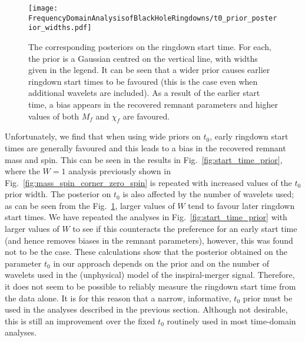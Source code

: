 \begin{figure}[t!]
    \centering
    \texttt{[image: FrequencyDomainAnalysisofBlackHoleRingdowns/t0\_prior\_posterior\_widths.pdf]}
    \caption[SHORT CAPTION]{ 
    The corresponding posteriors on the ringdown start time. For each, the prior is a Gaussian centred on the vertical line, with widths given in the legend.
    It can be seen that a wider prior causes earlier ringdown start times to be favoured (this is the case even when additional wavelets are included). As a result of the earlier start time, a bias appears in the recovered remnant parameters and higher values of both $M_f$ and $\chi_f$ are favoured.
    }
    \label{fig:start_time_posterior}
\end{figure}

Unfortunately, we find that when using wide priors on $t_0$, early ringdown start times are generally favoured and this leads to a bias in the recovered remnant mass and spin.
This can be seen in the results in Fig.~\ref{fig:start_time_prior}, where the $W=1$ analysis previously shown in Fig.~\ref{fig:mass_spin_corner_zero_spin} is repeated with increased values of the $t_0$ prior width.
The posterior on $t_0$ is also affected by the number of wavelets used;
as can be seen from the Fig.~\ref{fig:start_time_posterior}, larger values of $W$ tend to favour later ringdown start times. 
We have repeated the analyses in Fig.~\ref{fig:start_time_prior} with larger values of $W$ to see if this counteracts the preference for an early start time (and hence removes biases in the remnant parameters), however, this was found not to be the case.
These calculations show that the posterior obtained on the parameter $t_0$ in our approach depends on the prior and on the number of wavelets used in the (unphysical) model of the inspiral-merger signal.
Therefore, it does not seem to be possible to reliably measure the ringdown start time from the data alone.
It is for this reason that a narrow, informative, $t_0$ prior must be used in the analyses described in the previous section.
Although not desirable, this is still an improvement over the fixed $t_0$ routinely used in most time-domain analyses.

